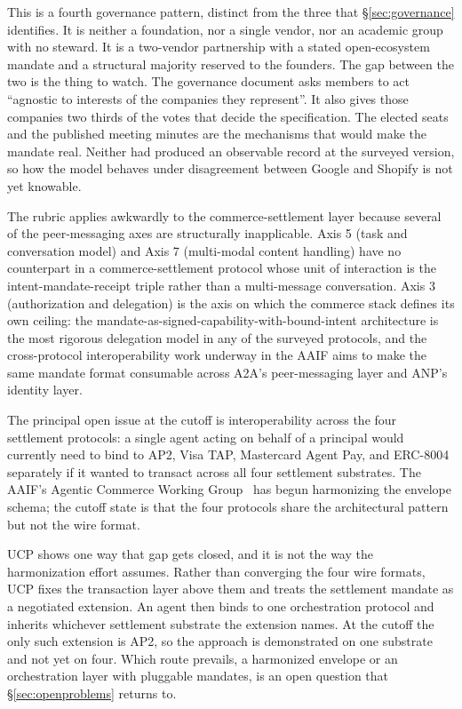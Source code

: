 This is a fourth governance pattern, distinct from the three
that \S\ref{sec:governance} identifies. It is neither a
foundation, nor a single vendor, nor an academic group with no
steward. It is a two-vendor partnership with a stated
open-ecosystem mandate and a structural majority reserved to
the founders. The gap between the two is the thing to watch.
The governance document asks members to act ``agnostic to
interests of the companies they represent''. It also gives
those companies two thirds of the votes that decide the
specification. The elected seats and the published meeting
minutes are the mechanisms that would make the mandate real.
Neither had produced an observable record at the surveyed
version, so how the model behaves under disagreement between
Google and Shopify is not yet knowable.

The rubric applies awkwardly to the commerce-settlement
layer because several of the peer-messaging axes are
structurally inapplicable. Axis 5 (task and conversation
model) and Axis 7 (multi-modal content handling) have no
counterpart in a commerce-settlement protocol whose unit
of interaction is the intent-mandate-receipt triple
rather than a multi-message conversation. Axis 3
(authorization and delegation) is the axis on which the
commerce stack defines its own ceiling: the
mandate-as-signed-capability-with-bound-intent
architecture is the most rigorous delegation model in any
of the surveyed protocols, and the cross-protocol
interoperability work underway in the AAIF aims to make
the same mandate format consumable across A2A's
peer-messaging layer and ANP's identity layer.

The principal open issue at the cutoff is interoperability
across the four settlement protocols: a single agent
acting on behalf of a principal would currently need to
bind to AP2, Visa TAP, Mastercard Agent Pay, and
ERC-8004 separately if it wanted to transact across all
four settlement substrates. The AAIF's Agentic Commerce
Working Group~\cite{lf_aaif} has begun harmonizing the
envelope schema; the cutoff state is that the four
protocols share the architectural pattern but not the
wire format.

UCP shows one way that gap gets closed, and it is not the
way the harmonization effort assumes. Rather than
converging the four wire formats, UCP fixes the
transaction layer above them and treats the settlement
mandate as a negotiated extension. An agent then binds to
one orchestration protocol and inherits whichever
settlement substrate the extension names. At the cutoff
the only such extension is AP2, so the approach is
demonstrated on one substrate and not yet on four. Which
route prevails, a harmonized envelope or an orchestration
layer with pluggable mandates, is an open question that
\S\ref{sec:openproblems} returns to.

